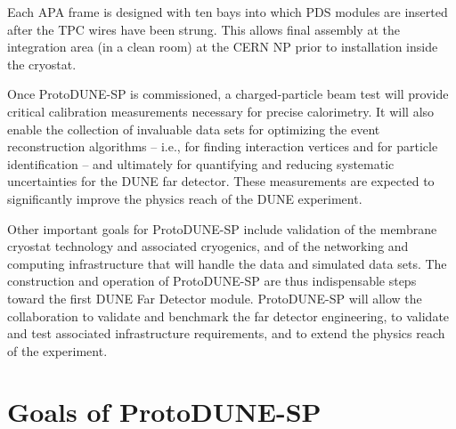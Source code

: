 Each APA frame is designed with ten bays into which PDS modules are inserted after the TPC wires have been strung. This  allows final assembly at the integration area (in a clean room) at the CERN NP prior to installation inside the cryostat. 


Once ProtoDUNE-SP is commissioned, a charged-particle beam test will provide critical calibration measurements necessary for precise calorimetry. It will also enable the collection of invaluable data sets for optimizing the event reconstruction algorithms -- i.e., for finding interaction vertices and for particle identification -- and ultimately for quantifying and reducing systematic uncertainties for the DUNE far detector. These measurements are expected to significantly improve the physics reach of the DUNE experiment.

Other important goals for ProtoDUNE-SP include validation of the membrane cryostat technology and associated cryogenics, and of the networking and computing infrastructure that will handle the data and simulated data sets.
The construction and operation of ProtoDUNE-SP are thus indispensable steps toward the first DUNE Far Detector module. ProtoDUNE-SP will allow the collaboration to validate and benchmark the far detector engineering, to validate and test associated infrastructure requirements, and to extend the physics reach of the experiment. 


\section{Goals of ProtoDUNE-SP}


